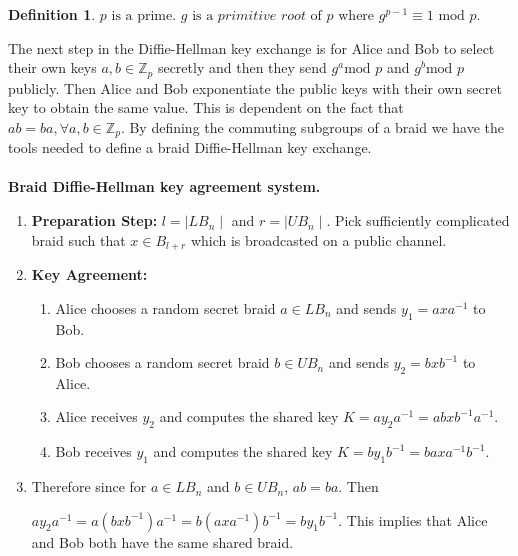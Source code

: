 \documentclass{article}
\theoremstyle{definition}
\newtheorem{definition}{Definition}[section]
\begin{document}
\begin{definition}
$p \text{ is a prime. } g \text{ is a }\textit{primitive root } \text{of }p \text{ where }g^{p-1}\equiv 1 \text{ mod }p. $
\end{definition}

The next step in the Diffie-Hellman key exchange is for Alice and Bob to select their own keys $a,b \in \mathbb{Z}_p$  secretly and then they send $g^a \text{mod }p$ and $g^b \text{mod }p$ publicly. Then Alice and Bob exponentiate the public keys with their own secret key to obtain the same value. This is dependent on the fact that $ab=ba,  \forall a,b \in \mathbb{Z}_p$. By defining the commuting subgroups of a braid we have the tools needed to define a braid Diffie-Hellman key exchange. 
\\ \\
\textbf{Braid Diffie-Hellman key agreement system.}
\begin{enumerate}

\item \textbf{Preparation Step:} $l=\mid LB_n \mid$ and $r=\mid UB_n \mid$. Pick sufficiently complicated braid such that $x \in B_{l+r}$ which is broadcasted on a public channel. 

\item \textbf{Key Agreement:} 
	 \begin{enumerate}
	 	\item Alice chooses a random secret braid $a \in LB_n$ and sends $y_1=axa^{-1}$ to Bob.
		\item Bob chooses a random secret braid $b \in UB_n$ and sends $y_2=bxb^{-1}$ to Alice.
		\item Alice receives $y_2$ and computes the shared key $K=ay_2a^{-1}=abxb^{-1}a^{-1}$.
		\item Bob receives $y_1$ and computes the shared key $K=by_1b^{-1}=baxa^{-1}b^{-1}$.
	 \end{enumerate}
\item Therefore since for $a \in LB_n$ and $b \in UB_n$, $ab=ba$. Then
\begin{centering}
$ay_2a^{-1}=a(bxb^{-1})a^{-1}=b(axa^{-1})b^{-1}=by_1b^{-1}$. This implies that Alice and Bob both have the same shared braid.
\end{centering}
\end{enumerate}
\end{document}
